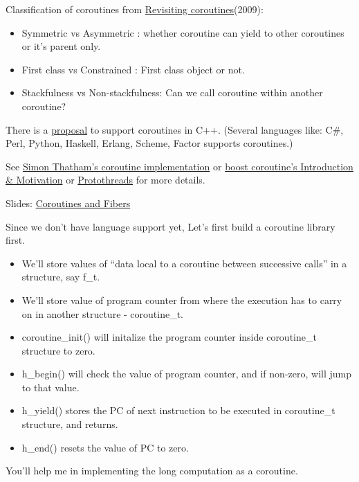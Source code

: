 \documentclass[]{article}
\providecommand{\tightlist}{%
  \setlength{\itemsep}{0pt}\setlength{\parskip}{0pt}}
\begin{document}
Classification of coroutines from
\href{http://dl.acm.org/citation.cfm?id=1462167}{Revisiting
coroutines}(2009):

\begin{itemize}
\tightlist
\item
  Symmetric vs Asymmetric : whether coroutine can yield to other
  coroutines or it's parent only.
\item
  First class vs Constrained : First class object or not.
\item
  Stackfulness vs Non-stackfulness: Can we call coroutine within another
  coroutine?
\end{itemize}

There is a \href{http://isocpp.org/files/papers/n3985.pdf}{proposal} to
support coroutines in C++. (Several languages like: C\#, Perl, Python,
Haskell, Erlang, Scheme, Factor supports coroutines.)

See
\href{http://www.chiark.greenend.org.uk/~sgtatham/coroutines.html}{Simon
Thatham's coroutine implementation} or
\href{http://www.boost.org/doc/libs/1_57_0/libs/coroutine/doc/html/index.html}{boost
coroutine's Introduction \& Motivation} or
\href{http://dunkels.com/adam/pt/}{Protothreads} for more details.

Slides:
\href{http://www.open-std.org/jtc1/sc22/wg21/docs/papers/2014/n4287.pdf}{Coroutines
and Fibers}

Since we don't have language support yet, Let's first build a coroutine
library first.

\begin{itemize}
\tightlist
\item
  We'll store values of ``data local to a coroutine between successive
  calls'' in a structure, say f\_t.
\item
  We'll store value of program counter from where the execution has to
  carry on in another structure - coroutine\_t.
\item
  coroutine\_init() will initalize the program counter inside
  coroutine\_t structure to zero.
\item
  h\_begin() will check the value of program counter, and if non-zero,
  will jump to that value.
\item
  h\_yield() stores the PC of next instruction to be executed in
  coroutine\_t structure, and returns.
\item
  h\_end() resets the value of PC to zero.
\end{itemize}

You'll help me in implementing the long computation as a coroutine.
\end{document}
